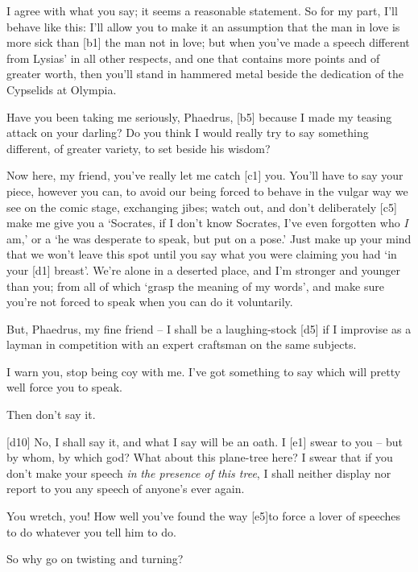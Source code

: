  I agree with what you say; it seems a reasonable statement. So
for my part, I'll behave like this: I'll allow you to make it an
assumption that the man in love is more sick than {[}b1{]} the man not
in love; but when you've made a speech different from Lysias' in all
other respects, and one that contains more points and of greater worth,
then you'll stand in hammered metal beside the dedication of the
Cypselids at Olympia.

 Have you been taking me seriously, Phaedrus, {[}b5{]} because I
made my teasing attack on your darling? Do you think I would really try
to say something different, of greater variety, to set beside his
wisdom?

 Now here, my friend, you've really let me catch {[}c1{]} you.
You'll have to say your piece, however you can, to avoid our being
forced to behave in the vulgar way we see on the comic stage, exchanging
jibes; watch out, and don't deliberately {[}c5{]} make me give you a
‘Socrates, if I don't know Socrates, I've even forgotten who {\em I}
am,' or a ‘he was desperate to speak, but put on a pose.' Just make up
your mind that we won't leave this spot until you say what you were
claiming you had ‘in your {[}d1{]} breast'. We're alone in a deserted
place, and I'm stronger and younger than you; from all of which ‘grasp
the meaning of my words',
and make sure you're not forced to speak when you can do it voluntarily.

 But, Phaedrus, my fine friend -- I shall be a laughing-stock
{[}d5{]} if I improvise as a layman in competition with an expert
craftsman on the same
subjects.

 I warn you, stop being coy with me. I've got something to say
which will pretty well force you to speak.

 Then don't say it.

{[}d10{]}  No, I shall say it, and what I say will be an oath. I
{[}e1{]} swear to you -- but by whom, by which god? What about this
plane-tree here? I swear that if you don't make your speech {\em in}
{\em the presence of this tree}, I shall neither display nor report to
you any speech of anyone's ever again.

 You wretch, you! How well you've found the way {[}e5{]}to force
a lover of speeches to do whatever you tell him to do.

 So why go on twisting and turning?

